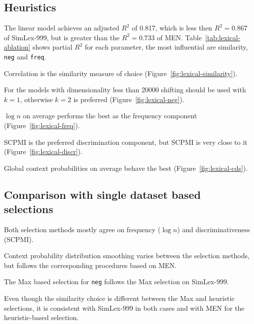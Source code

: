 

\subsection{Heuristics}



The linear model achieves an adjusted $R^2$ of 0.817, which is less then $R^2 = 0.867$ of SimLex-999, but is greater than the $R^2 = 0.733$ of MEN. Table~\ref{tab:lexical-ablation} shows partial $R^2$ for each parameter, the most influential are similarity, \texttt{neg} and \texttt{freq}.


Correlation is the similarity measure of choice (Figure~\ref{fig:lexical-similarity}).

% 
For the models with dimensionality less than 20000 shifting should be used with $k = 1$, otherwise $k = 2$ is preferred (Figure~\ref{fig:lexical-neg}).


$\log n$ on average performs the best as the frequency component (Figure~\ref{fig:lexical-freq}).

% 
SCPMI is the preferred discrimination component, but SCPMI is very close to it (Figure~\ref{fig:lexical-discr}).


Global context probabilities on average behave the best (Figure~\ref{fig:lexical-cds}).



\subsection{Comparison with single dataset based selections}

Both selection methods mostly agree on frequency ($\log n$) and discriminativeness (SCPMI).

Context probability distribution smoothing varies between the selection methods, but follows the corresponding procedures based on MEN.

The Max based selection for \texttt{neg} follows the Max selection on SimLex-999.

Even though the similarity choice is different between the Max and heuristic selections, it is consistent with SimLex-999 in both cases and with MEN for the heuristic-based selection.

